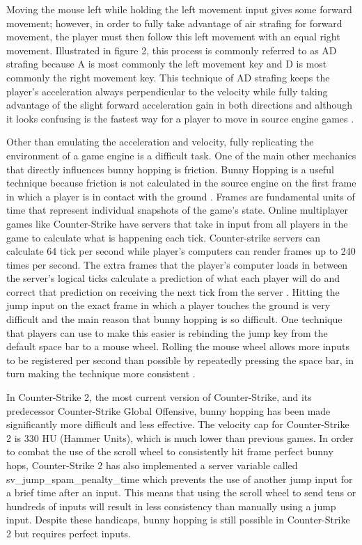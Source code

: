 \documentclass[10pt,twocolumn]{article}
\begin{document}
Moving the mouse left while holding the left movement input gives some forward movement; however, in order to fully take advantage of air strafing for forward movement, the player must then follow this left movement with an equal right movement. Illustrated in figure 2, this process is commonly referred to as AD strafing because A is most commonly the left movement key and D is most commonly the right movement key. This technique of AD strafing keeps the player's acceleration always perpendicular to the velocity while fully taking advantage of the slight forward acceleration gain in both directions and although it looks confusing is the fastest way for a player to move in source engine games \cite{AirStrafingExplained}.

Other than emulating the acceleration and velocity, fully replicating the environment of a game engine is a difficult task. One of the main other mechanics that directly influences bunny hopping is friction. Bunny Hopping is a useful technique because friction is not calculated in the source engine on the first frame in which a player is in contact with the ground \cite{BunnyHoppingProgrammers}. Frames are fundamental units of time that represent individual snapshots of the game's state. Online multiplayer games like Counter-Strike have servers that take in input from all players in the game to calculate what is happening each tick. Counter-strike servers can calculate 64 tick per second while player's computers can render frames up to 240 times per second. The extra frames that the player's computer loads in between the server's logical ticks calculate a prediction of what each player will do and correct that prediction on receiving the next tick from the server \cite{MoreSteamAirstrafe}. Hitting the jump input on the exact frame in which a player touches the ground is very difficult and the main reason that bunny hopping is so difficult. One technique that players can use to make this easier is rebinding the jump key from the default space bar to a mouse wheel. Rolling the mouse wheel allows more inputs to be registered per second than possible by repeatedly pressing the space bar, in turn making the technique more consistent \cite{BhopTutorialValorant}.

In Counter-Strike 2, the most current version of Counter-Strike, and its predecessor Counter-Strike Global Offensive, bunny hopping has been made significantly more difficult and less effective. The velocity cap for Counter-Strike 2 is 330 HU (Hammer Units), which is much lower than previous games. In order to combat the use of the scroll wheel to consistently hit frame perfect bunny hops, Counter-Strike 2 has also implemented a server variable called sv\_jump\_spam\_penalty\_time which prevents the use of another jump input for a brief time after an input\cite{HowToBhopCS2}. This means that using the scroll wheel to send tens or hundreds of inputs will result in less consistency than manually using a jump input. Despite these handicaps, bunny hopping is still possible in Counter-Strike 2 but requires perfect inputs.
\end{document}
